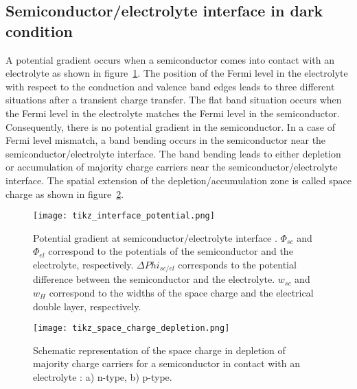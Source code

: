 \subsection{Semiconductor/electrolyte interface in dark condition}
    A potential gradient occurs when a semiconductor comes into contact with an 
    electrolyte as shown in figure~\ref{fig_interface_potential}.
    The position of the Fermi level in the electrolyte with respect to the 
    conduction and valence band edges leads to three different situations after 
    a transient charge transfer. 
    The flat band situation occurs when the Fermi level in the electrolyte 
    matches the Fermi level in the semiconductor.  
    Consequently, there is no potential gradient in the semiconductor. 
    In a case of Fermi level mismatch, a band bending occurs in the semiconductor 
    near the semiconductor/electrolyte interface.  
    The band bending leads to either depletion or accumulation of majority 
    charge carriers near the semiconductor/electrolyte interface. 
    The spatial extension of the depletion/accumulation zone is called space 
    charge as shown in figure~\ref{fig_space_charge_depletion}. 

    \begin{figure}[h]
        \centering
        \texttt{[image: tikz\_interface\_potential.png]}
        \caption{Potential gradient at semiconductor/electrolyte interface 
        \citep{marcus2006}. $\Phi_{sc}$ and $\Phi_{el}$ correspond to the 
        potentials of the semiconductor and the electrolyte, respectively. 
        $\Delta Phi _{sc/el}$ corresponds to the potential difference between 
        the semiconductor and the electrolyte. $w_{sc}$ and $w_{H}$ correspond to 
        the widths of the space charge and the electrical double layer, 
        respectively.}
        \label{fig_interface_potential}
    \end{figure}

    \begin{figure}[H]
        \centering
        \texttt{[image: tikz\_space\_charge\_depletion.png]}
        \caption{Schematic representation of the space charge in depletion of majority charge carriers for 
        a semiconductor in contact with an electrolyte \citep{memming2008,bard2002}:
         a) n-type, b) p-type.}
        \label{fig_space_charge_depletion}
    \end{figure}

